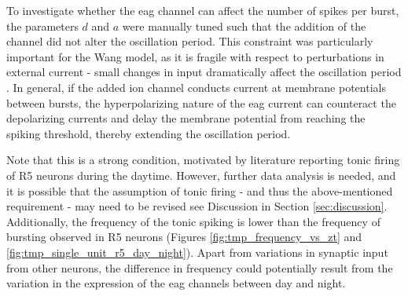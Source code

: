 \documentclass[../main.tex]{subfiles}
\begin{document}
To investigate whether the \gls{eag} channel can affect the number of spikes per burst, the parameters $d$ and $a$ were manually tuned such that the addition of the channel did not alter the oscillation period. This constraint was particularly important for the Wang model, as it is fragile with respect to perturbations in external current - small changes in input dramatically affect the oscillation period \parencite{wangMultipleDynamicalModes1994}.
In general, if the added ion channel conducts current at membrane potentials between bursts, the hyperpolarizing nature of the \gls{eag} current can counteract the depolarizing currents and delay the membrane potential from reaching the spiking threshold, thereby extending the oscillation period.

Note that this is a strong condition, motivated by literature reporting tonic firing of R5 neurons during the daytime.  However, further data analysis is needed, and it is possible that the assumption of tonic firing - and thus the above-mentioned requirement - may need to be revised see Discussion in Section \ref{sec:discussion}. Additionally, the frequency of the tonic spiking is lower than the frequency of bursting observed in R5 neurons (Figures \ref{fig:tmp_frequency_vs_zt} and \ref{fig:tmp_single_unit_r5_day_night}). Apart from variations in synaptic input from other neurons, the difference in frequency could potentially result from the variation in the expression of the \gls{eag} channels between day and night.

\end{document}

